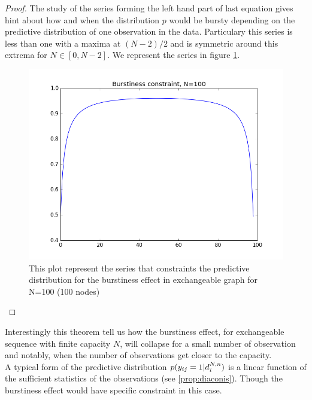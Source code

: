 \begin{proof}
	The study of the series forming the left hand part of last equation gives hint about how and when the distribution $p$ would be bursty depending on the predictive distribution of one observation in the data. Particulary this series is less than one with a maxima at $(N-2)/2$ and is symmetric around this extrema for $N \in [0, N-2]$. We represent the series in figure \ref{fig:bp}.
	
	
	\begin{figure}[h]
		\centering
		\includegraphics[scale=0.4]{img/bp}
		\caption{This plot represent the series that constraints the predictive distribution for the burstiness effect in exchangeable graph for N=100 (100 nodes)}
		\label{fig:bp}
	\end{figure}

\label{b-theorem}
\end{proof}

Interestingly this theorem tell us how the burstiness effect, for exchangeable sequence with finite capacity $N$, will collapse for a small number of observation and notably, when the number of observations get closer to the capacity.\\

A typical form of the predictive distribution $p(y_{ij}=1 | d_i^{N,n})$ is a linear function of the sufficient statistics of the observations (see \ref{prop:diaconis}). Though the burstiness effect would have specific constraint in this case.

